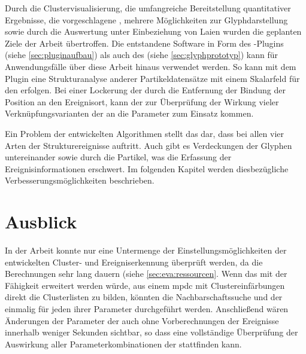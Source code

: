 Durch die Clustervisualisierung, die umfangreiche Bereitstellung quantitativer Ergebnisse, die vorgeschlagene , mehrere Möglichkeiten zur Glyphdarstellung sowie durch die Auswertung unter Einbeziehung von Laien wurden die geplanten Ziele der Arbeit übertroffen. Die entstandene Software in Form des -Plugins (siehe \autoref{sec:pluginaufbau}) als auch des  (siehe \autoref{sec:glyphprototyp}) kann für Anwendungsfälle über diese Arbeit hinaus verwendet werden. So kann mit dem Plugin eine Strukturanalyse anderer Partikeldatensätze mit einem Skalarfeld für den  erfolgen. Bei einer Lockerung der  durch die Entfernung der Bindung der Position an den Ereignisort, kann der  zur Überprüfung der Wirkung vieler Verknüpfungsvarianten der  an die Parameter zum Einsatz kommen.

Ein Problem der entwickelten Algorithmen stellt das  dar, dass bei allen vier Arten der Strukturereignisse auftritt.
Auch gibt es Verdeckungen der Glyphen untereinander sowie durch die Partikel, was die Erfassung der Ereignisinformationen erschwert. Im folgenden Kapitel werden diesbezügliche Verbesserungsmöglichkeiten beschrieben.


\chapter{Ausblick}\label{sec:ausblick}
In der Arbeit konnte nur eine Untermenge der Einstellungsmöglichkeiten der entwickelten Cluster- und Ereigniserkennung überprüft werden, da die Berechnungen sehr lang dauern (siehe \autoref{sec:eva:ressourcen}. Wenn das \SECalc mit der Fähigkeit erweitert werden würde, aus einem \gls{mpdc} mit Clustereinfärbungen direkt die Clusterlisten zu bilden, könnten die Nachbarschaftssuche und der \CFD einmalig für jeden ihrer Parameter durchgeführt werden. Anschließend wären Änderungen der Parameter der  auch ohne Vorberechnungen der Ereignisse innerhalb weniger Sekunden sichtbar, so dass eine vollständige Überprüfung der Auswirkung aller Parameterkombinationen der  stattfinden kann.

